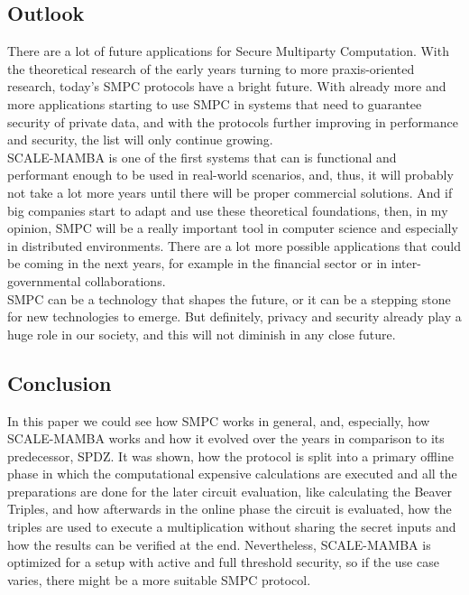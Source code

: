 \documentclass[english,runningheads,a4paper]{llncs}[2018/03/10]
\begin{document}
\subsection{Outlook}
There are a lot of future applications for Secure Multiparty Computation. With the theoretical research of the early years turning to more praxis-oriented research, today's SMPC protocols have a bright future. With already more and more applications starting to use SMPC in systems that need to guarantee security of private data, and with the protocols further improving in performance and security, the list will only continue growing.\\
SCALE-MAMBA is one of the first systems that can is functional and performant enough to be used in real-world scenarios, and, thus, it will probably not take a lot more years until there will be proper commercial solutions. And if big companies start to adapt and use these theoretical foundations, then, in my opinion, SMPC will be a really important tool in computer science and especially in distributed environments. There are a lot more possible applications that could be coming in the next years, for example in the financial sector or in inter-governmental collaborations.\\
SMPC can be a technology that shapes the future, or it can be a stepping stone for new technologies to emerge. But definitely, privacy and security already play a huge role in our society, and this will not diminish in any close future.
\subsection{Conclusion}
In this paper we could see how SMPC works in general, and, especially, how SCALE-MAMBA works and how it evolved over the years in comparison to its predecessor, SPDZ. It was shown, how the protocol is split into a primary offline phase in which the computational expensive calculations are executed and all the preparations are done for the later circuit evaluation, like calculating the Beaver Triples, and how afterwards in the online phase the circuit is evaluated, how the triples are used to execute a multiplication without sharing the secret inputs and how the results can be verified at the end. Nevertheless, SCALE-MAMBA is optimized for a setup with active and full threshold security, so if the use case varies, there might be a more suitable SMPC protocol.


\renewcommand{\bibsection}{\section*{References}} %

\begingroup
  \ifluatex
  \else
  \fi
  \small %
  
\endgroup

\ \\
%
\end{document}
